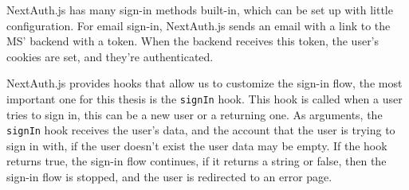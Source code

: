 NextAuth.js has many sign-in methods built-in, which can be set up with little configuration.
For email sign-in, NextAuth.js sends an email with a link to the MS' backend with a token. 
When the backend receives this token, the user's cookies are set, and they're authenticated.


NextAuth.js provides hooks that allow us to customize the sign-in flow, the most important
one for this thesis is the \lstinline{signIn} hook.
This hook is called when a user tries to sign in, this can be a new user or a returning
one.
As arguments, the \lstinline{signIn} hook receives the user's data,
and the account that the user is trying to sign in with,
if the user doesn't exist the user data may be empty.
If the hook returns true, the sign-in flow continues, if it returns a string or false,
then the sign-in flow is stopped, and the user is redirected to an error page.

%
%


%
%



